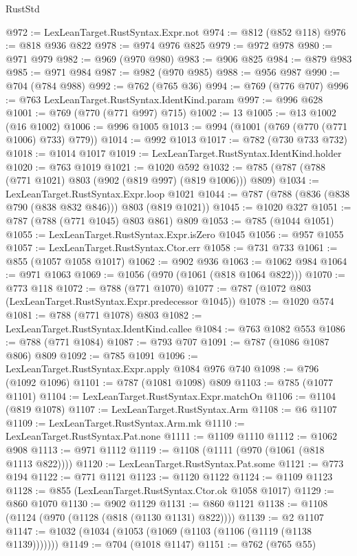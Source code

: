 \begin{lexlean}{RustStd}
\begin{coremodule}
@972 := LexLeanTarget.RustSyntax.Expr.not
@974 := @812 (@852 @118)
@976 := @818 @936 @822
@978 := @974 @976 @825
@979 := @972 @978
@980 := @971 @979
@982 := @969 (@970 @980)
@983 := @906 @825
@984 := @879 @983
@985 := @971 @984
@987 := @982 (@970 @985)
@988 := @956 @987
@990 := @704 (@784 @988)
@992 := @762 (@765 @36)
@994 := @769 (@776 @707)
@996 := @763 LexLeanTarget.RustSyntax.IdentKind.param
@997 := @996 @628
@1001 := @769 (@770 (@771 @997) @715)
@1002 := 13
@1005 := @13 @1002 (@16 @1002)
@1006 := @996 @1005
@1013 := @994 (@1001 (@769 (@770 (@771 @1006) @733) @779))
@1014 := @992 @1013
@1017 := @782 (@730 @733 @732)
@1018 := @1014 @1017
@1019 := LexLeanTarget.RustSyntax.IdentKind.holder
@1020 := @763 @1019
@1021 := @1020 @592
@1032 := @785 (@787 (@788 (@771 @1021) @803 (@902 (@819 @997) (@819 @1006))) @809)
@1034 := LexLeanTarget.RustSyntax.Expr.loop @1021
@1044 := @787 (@788 (@836 (@838 @790 (@838 @832 @846))) @803 (@819 @1021))
@1045 := @1020 @327
@1051 := @787 (@788 (@771 @1045) @803 @861) @809
@1053 := @785 (@1044 @1051)
@1055 := LexLeanTarget.RustSyntax.Expr.isZero @1045
@1056 := @957 @1055
@1057 := LexLeanTarget.RustSyntax.Ctor.err
@1058 := @731 @733
@1061 := @855 (@1057 @1058 @1017)
@1062 := @902 @936
@1063 := @1062 @984
@1064 := @971 @1063
@1069 := @1056 (@970 (@1061 (@818 @1064 @822)))
@1070 := @773 @118
@1072 := @788 (@771 @1070)
@1077 := @787 (@1072 @803 (LexLeanTarget.RustSyntax.Expr.predecessor @1045))
@1078 := @1020 @574
@1081 := @788 (@771 @1078) @803
@1082 := LexLeanTarget.RustSyntax.IdentKind.callee
@1084 := @763 @1082 @553
@1086 := @788 (@771 @1084)
@1087 := @793 @707
@1091 := @787 (@1086 @1087 @806) @809
@1092 := @785 @1091
@1096 := LexLeanTarget.RustSyntax.Expr.apply @1084 @976 @740
@1098 := @796 (@1092 @1096)
@1101 := @787 (@1081 @1098) @809
@1103 := @785 (@1077 @1101)
@1104 := LexLeanTarget.RustSyntax.Expr.matchOn
@1106 := @1104 (@819 @1078)
@1107 := LexLeanTarget.RustSyntax.Arm
@1108 := @6 @1107
@1109 := LexLeanTarget.RustSyntax.Arm.mk
@1110 := LexLeanTarget.RustSyntax.Pat.none
@1111 := @1109 @1110
@1112 := @1062 @908
@1113 := @971 @1112
@1119 := @1108 (@1111 (@970 (@1061 (@818 @1113 @822))))
@1120 := LexLeanTarget.RustSyntax.Pat.some
@1121 := @773 @194
@1122 := @771 @1121
@1123 := @1120 @1122
@1124 := @1109 @1123
@1128 := @855 (LexLeanTarget.RustSyntax.Ctor.ok @1058 @1017)
@1129 := @860 @1070
@1130 := @902 @1129
@1131 := @860 @1121
@1138 := @1108 (@1124 (@970 (@1128 (@818 (@1130 @1131) @822))))
@1139 := @2 @1107
@1147 := @1032 (@1034 (@1053 (@1069 (@1103 (@1106 (@1119 (@1138 @1139)))))))
@1149 := @704 (@1018 @1147)
@1151 := @762 (@765 @55)

\end{coremodule}
\end{lexlean}
